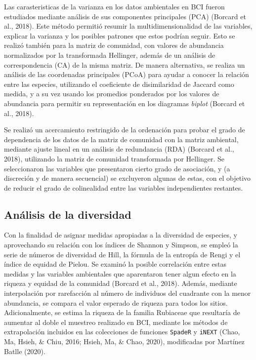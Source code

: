 \documentclass[11pt,]{article}
\begin{document}
Las carasteristicas de la varianza en los datos ambientales en BCI
fueron estudiados mediante análisis de sus componentes principales (PCA)
(Borcard et al., 2018). Este método permitió resumir la
multidimensionalidad de las variables, explicar la varianza y los
posibles patrones que estos podrían seguir. Esto se realizó también para
la matriz de comunidad, con valores de abundancia normalizados por la
transformada Hellinger, además de un análisis de correspondencia (CA) de
la misma matriz. De manera alternativa, se realiza un análisis de las
coordenadas principales (PCoA) para ayudar a conocer la relación entre
las especies, utilizando el coeficiente de disimilaridad de Jaccard como
medida, y a su vez usando los promedios ponderados por los valores de
abundancia para permitir su representación en los diagramas
\emph{biplot} (Borcard et al., 2018).

Se realizó un acercamiento restringido de la ordenación para probar el
grado de dependencia de los datos de la matriz de comunidad con la
matriz ambiental, mediante ajuste lineal en un análisis de redundancia
(RDA) (Borcard et al., 2018), utilizando la matriz de comunidad
transformada por Hellinger. Se seleccionaron las variables que
presentaron cierto grado de asociación, y (a discreción y de manera
secuencial) se excluyeron algunas de estas, con el objetivo de reducir
el grado de colinealidad entre las variables independientes restantes.

\subsection{Análisis de la
diversidad}\label{anuxe1lisis-de-la-diversidad}

Con la finalidad de asignar medidas apropiadas a la diversidad de
especies, y aprovechando su relación con los índices de Shannon y
Simpson, se empleó la serie de números de diversidad de Hill, la fórmula
de la entropía de Rengi y el índice de equidad de Pielou. Se examinó la
posible correlación entre estas medidas y las variables ambientales que
aparentaron tener algun efecto en la riqueza y equidad de la comunidad
(Borcard et al., 2018). Además, mediante interpolación por rarefacción
al número de individuos del cuadrante con la menor abundancia, se
compara el valor esperado de riqueza para todos los sitios.
Adicionalmente, se estima la riqueza de la familia Rubiaceae que
resultaría de aumentar al doble el muestreo realizado en BCI, mediante
los métodos de extrapolación incluidos en las colecciones de funciones
\texttt{SpadeR} y \texttt{iNEXT} (Chao, Ma, Hsieh, \& Chiu, 2016; Hsieh,
Ma, \& Chao, 2020), modificadas por Martínez Batlle (2020).
\end{document}
